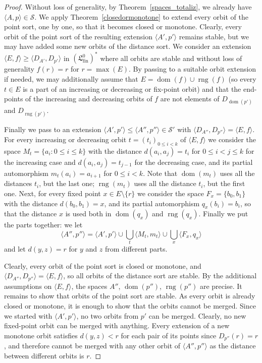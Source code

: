 \documentclass[10pt,a4paper]{article}
\theoremstyle{definition}
\theoremstyle{remark}
\newcommand \set [1]{\{#1\}}
\newcommand \seq [1]{\langle #1 \rangle}
\newcommand \dom {\operatorname{dom}}
\newcommand \rng {\operatorname{rng}}
\newcommand \Su {\mathscr{S}}
\newcommand \fin {{\operatorname{fin}}}
\newcommand \Lin {\mathfrak{L}}
\begin{document}
\begin{proof}
    Without loss of generality, by Theorem~\ref{spaces_totaliz}, we already have $\seq{A, p} \in \Su$.
    We apply Theorem~\ref{closedormonotone} to extend every orbit of the point sort, one by one, so that it becomes closed or monotone.
    Clearly, every orbit of the point sort of the resulting extension $\seq{A', p'}$ remains stable, but we may have added some new orbits of the distance sort.
    We consider an extension $\seq{E, f} \geq \seq{D_{A'}, D_{p'}}$ in $(\Lin^0_\fin)^*$ where all orbits are stable and without loss of generality $f(r) = r$ for $r = \max(E)$.
    By passing to a suitable orbit extension if needed, we may additionally assume that $E = \dom(f) \cup \rng(f)$ (so every $t \in E$ is a part of an increasing or decreasing or fix-point orbit) and that the end-points of the increasing and decreasing orbits of $f$ are not elements of $D_{\dom(p')}$ and $D_{\rng(p')}$.

    Finally we pass to an extension $\seq{A', p'} \leq \seq{A'', p''} \in \Su'$ with $\seq{D_{A''}, D_{p''}} = \seq{E, f}$.
    For every increasing or decreasing orbit $t = (t_i)_{0 \leq i < k}$ of $\seq{E, f}$ we consider the space $M_t = \set{a_i: 0 \leq i \leq k}$ with the distance $d(a_i, a_j) = t_i$ for $0 \leq i < j \leq k$ for the increasing case and $d(a_i, a_j) = t_{j - 1}$ for the decreasing case, and its partial automorphism $m_t(a_i) = a_{i + 1}$ for $0 \leq i < k$.
    Note that $\dom(m_t)$ uses all the distances $t_i$, but the last one; $\rng(m_t)$ uses all the distance $t_i$, but the first one.
    Next, for every fixed point $x \in E \setminus \set{r}$ we consider the space $F_x = \set{b_0, b_1}$ with the distance $d(b_0, b_1) = x$, and its partial automorphism $q_x(b_i) = b_i$, so that the distance $x$ is used both in $\dom(q_x)$ and $\rng(q_x)$.
    Finally we put the parts together: we let 
    \[\textstyle
        \seq{A'', p''} = \seq{A', p'} \cup \bigcup_t \seq{M_t, m_t} \cup \bigcup_x \seq{F_x, q_x}
    \]
    and let $d(y, z) = r$ for $y$ and $z$  from different parts.

    Clearly, every orbit of the point sort is closed or monotone, and $\seq{D_{A''}, D_{p''}} = \seq{E, f}$, so all orbits of the distance sort are stable.
    By the additional assumptions on $\seq{E, f}$, the spaces $A''$, $\dom(p'')$, $\rng(p'')$ are precise.
    It remains to show that orbits of the point sort are stable.
    As every orbit is already closed or monotone, it is enough to show that the orbits cannot be merged.
    Since we started with $\seq{A', p'}$, no two orbits from $p'$ can be merged.
    Clearly, no new fixed-point orbit can be merged with anything.
    Every extension of a new monotone orbit satisfies $d(y, z) < r$ for each pair of its points since $D_{p''}(r) = r$, and therefore cannot be merged with any other orbit of $\seq{A'', p''}$ as the distance between different orbits is $r$.
\end{proof}
\end{document}
